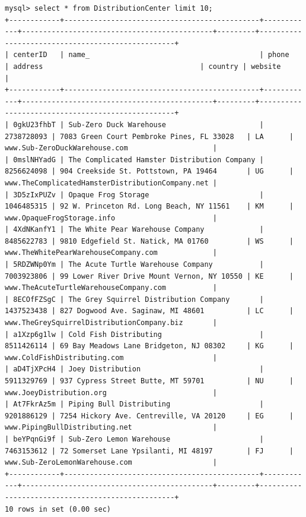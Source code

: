 \documentclass[american,extrafontsizes,12pt,portrait,letterpaper,oneside,onecolumn,final]{memoir}
\begin{document}
\begin{verbatim}
mysql> select * from DistributionCenter limit 10;
+------------+----------------------------------------------+------------+---------------------------------------------+---------+--------------------------------------------------+
| centerID   | name_                                        | phone      | address                                     | country | website                                          |
+------------+----------------------------------------------+------------+---------------------------------------------+---------+--------------------------------------------------+
| 0gkU23fhbT | Sub-Zero Duck Warehouse                      | 2738728093 | 7083 Green Court Pembroke Pines, FL 33028   | LA      | www.Sub-ZeroDuckWarehouse.com                    |
| 0mslNHYadG | The Complicated Hamster Distribution Company | 8256624098 | 904 Creekside St. Pottstown, PA 19464       | UG      | www.TheComplicatedHamsterDistributionCompany.net |
| 3D5zIxPUZv | Opaque Frog Storage                          | 1046485315 | 92 W. Princeton Rd. Long Beach, NY 11561    | KM      | www.OpaqueFrogStorage.info                       |
| 4XdNKanfY1 | The White Pear Warehouse Company             | 8485622783 | 9810 Edgefield St. Natick, MA 01760         | WS      | www.TheWhitePearWarehouseCompany.com             |
| 5RDZWNp0Ym | The Acute Turtle Warehouse Company           | 7003923806 | 99 Lower River Drive Mount Vernon, NY 10550 | KE      | www.TheAcuteTurtleWarehouseCompany.com           |
| 8ECOfFZSgC | The Grey Squirrel Distribution Company       | 1437523438 | 827 Dogwood Ave. Saginaw, MI 48601          | LC      | www.TheGreySquirrelDistributionCompany.biz       |
| a1Xzp6g1lw | Cold Fish Distributing                       | 8511426114 | 69 Bay Meadows Lane Bridgeton, NJ 08302     | KG      | www.ColdFishDistributing.com                     |
| aD4TjXPcH4 | Joey Distribution                            | 5911329769 | 937 Cypress Street Butte, MT 59701          | NU      | www.JoeyDistribution.org                         |
| At7FkrAz5m | Piping Bull Distributing                     | 9201886129 | 7254 Hickory Ave. Centreville, VA 20120     | EG      | www.PipingBullDistributing.net                   |
| beYPqnGi9f | Sub-Zero Lemon Warehouse                     | 7463153612 | 72 Somerset Lane Ypsilanti, MI 48197        | FJ      | www.Sub-ZeroLemonWarehouse.com                   |
+------------+----------------------------------------------+------------+---------------------------------------------+---------+--------------------------------------------------+
10 rows in set (0.00 sec)


\end{verbatim}
\end{document}
